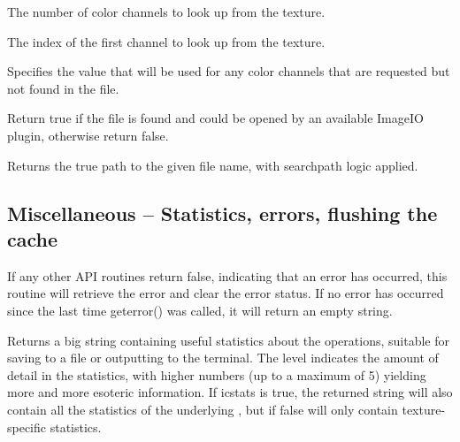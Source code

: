 \vspace{-12pt}
\vspace{10pt}
The number of color channels to look up from the texture.
\apiend

\vspace{-24pt}
\vspace{10pt}
The index of the first channel to look up from the texture.
\apiend


\vspace{-24pt}
\vspace{10pt}
Specifies the value that will be used for any color channels that are
requested but not found in the file.
\apiend

Return true if the file is found and could be opened by an
available ImageIO plugin, otherwise return false.

\apiend

Returns the true path to the given file name, with searchpath logic
applied.
\apiend

\subsection{Miscellaneous -- Statistics, errors, flushing the cache}
\label{sec:texturesys:api:geterror}
\label{sec:texturesys:api:getstats}
\label{sec:texturesys:api:invalidate}

If any other API routines return {\cf false}, indicating that an
error has occurred, this routine will retrieve the error and clear
the error status.  If no error has occurred since the last time
{\cf geterror()} was called, it will return an empty string.
\apiend

Returns a big string containing useful statistics about the \ImageCache
operations, suitable for saving to a file or outputting to the terminal.
The {\cf level} indicates the amount of detail in the statistics,
with higher numbers (up to a maximum of 5) yielding more and more
esoteric information.  If {\cf icstats} is true, the returned string
will also contain all the statistics of the underlying \ImageCache,
but if false will only contain texture-specific statistics.
\apiend

